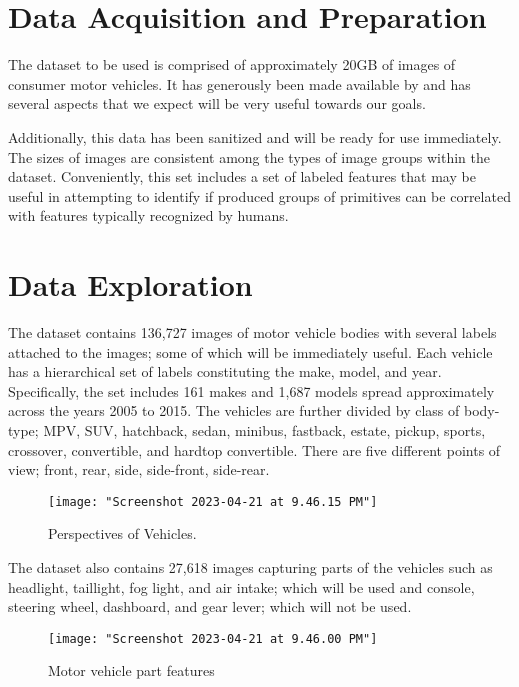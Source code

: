 \documentclass[sigplan,nonacm]{acmart}
\begin{document}
\section{Data Acquisition and Preparation}

The dataset to be used is comprised of approximately 20GB of images of consumer motor vehicles.
It has generously been made available by \cite{yang2015}
and has several aspects that we expect will be very useful towards our goals.

Additionally, this data has been sanitized and will be ready for use immediately.
The sizes of images are consistent among the types of image groups within the dataset.
Conveniently, this set includes a set of labeled features that may be useful in 
attempting to identify if produced groups of primitives can be correlated with
features typically recognized by humans.

\section{Data Exploration}

The \cite{yang2015} dataset contains 136,727 images of motor vehicle bodies with 
several labels attached to the images; some of which will be immediately useful.
Each vehicle has a hierarchical set of labels constituting the make, model, and year.
Specifically, the set includes 161 makes and 1,687 models spread approximately across
the years 2005 to 2015. The vehicles are further divided by class of body-type; 
MPV, SUV, hatchback, sedan, minibus, fastback, estate, pickup, sports, crossover, convertible, and hardtop convertible.
There are five different points of view; front, rear, side, side-front, side-rear.

\begin{figure}
	\centering
	\texttt{[image: "Screenshot 2023-04-21 at 9.46.15 PM"]}
	\caption{Perspectives of Vehicles.}
	\label{fig:car_perspectives}
\end{figure}

The \cite{yang2015} dataset also contains 27,618 images capturing parts
of the vehicles such as headlight, taillight, fog light, and air intake; which will be used and
console, steering wheel, dashboard, and gear lever; which will not be used.

\begin{figure}
	\centering
	\texttt{[image: "Screenshot 2023-04-21 at 9.46.00 PM"]}
	\caption{Motor vehicle part features}
	\label{fig:screenshot-2023-04-21-at-9}
\end{figure}
\end{document}
